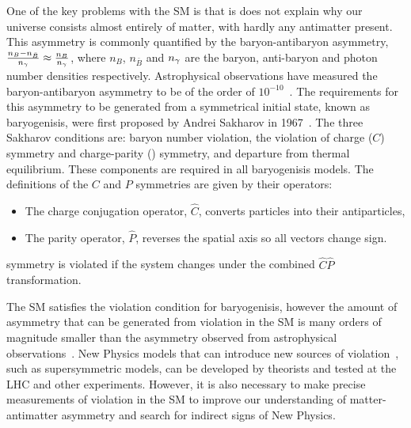 One of the key problems with the SM is that is does not explain why our universe consists almost entirely of matter, with hardly any antimatter present. This asymmetry is commonly quantified by the baryon-antibaryon asymmetry, $\frac{n_{B} - n_{\bar{B}}}{n_{{\gamma}}} \approx \frac{n_{B}}{n_{{\gamma}}}$, where $n_{B}$, $n_{\bar{B}}$ and $n_{{\gamma}}$ are the baryon, anti-baryon and photon number densities respectively. Astrophysical observations have measured the baryon-antibaryon asymmetry to be of the order of $10^{-10}$~\cite{astrophysicalasy}. The requirements for this asymmetry to be generated from a symmetrical initial state, known as baryogenisis, were first proposed by Andrei Sakharov in 1967~\cite{sakharov}. The three Sakharov conditions are: baryon number violation, the violation of charge ($C$) symmetry and charge-parity (\CP) symmetry, and departure from thermal equilibrium. These components are required in all baryogenisis models. The definitions of the $C$ and $P$ symmetries are given by their operators:
\begin{itemize}
\item The charge conjugation operator, $\hat{C}$, converts particles into their antiparticles,
\item The parity operator, $\hat{P}$, reverses the spatial axis so all vectors change sign.
\end{itemize}
\CP symmetry is violated if the system changes under the combined $\hat{C}\hat{P}$ transformation.

The SM satisfies the \CP violation condition for baryogenisis, however the amount of asymmetry that can be generated from \CP violation in the SM is many orders of magnitude smaller than the asymmetry observed from astrophysical observations~\cite{SMasy}. New Physics models that can introduce new sources of \CP violation~\cite{BSMCP}, such as supersymmetric models, can be developed by theorists and tested at the LHC and other experiments. However, it is also necessary to make precise measurements of \CP violation in the SM to improve our understanding of matter-antimatter asymmetry and search for indirect signs of New Physics.

